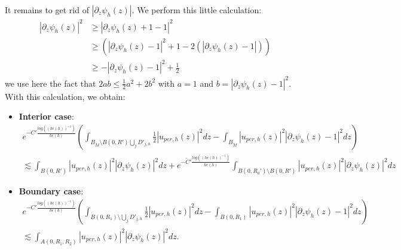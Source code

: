 \documentclass[leqno,11pt,letterpaper, english]{amsart}
\newcommand{\nn}{\nonumber}
\theoremstyle{plain}
\theoremstyle{definition}
\numberwithin{equation}{section}
\begin{document}
It remains to get rid of $|\partial_z \psi_h(z)|$. We perform this little calculation:
	\begin{align}
	\left|\partial_z \psi_h \left(z\right)\right|^2
		&\geq \left|\partial_z \psi_h \left(z\right)+1-1\right|^2\nn\\
		&\geq \left(\left|\partial_z \psi_h \left(z\right)-1\right|^2+1-2\left(\left|\partial_z \psi_h \left(z\right)-1\right|\right)\right)\nn\\
		&\geq - \left|\partial_z \psi_h \left(z\right)-1\right|^2 + \frac{1}{2} 
	\end{align}
we use here the fact that $2ab \leq \frac{1}{2}a^2 + 2b^2$ with $a = 1$ and $b = |\partial_z \psi_h(z) - 1|^2$. With this calculation, we obtain:
\begin{itemize}
\item \textbf{Interior case}:
	\begin{multline}
		e^{-C'  \frac{log((h\epsilon(h))^{-1})}{h\epsilon(h)}}\left(\int_{B_{\tilde{M}}\setminus B(0,R')\bigcup_j D'_{j,h}}  \frac{1}{2} |u_{per,h}(z)|^2 dz -\int_{B_{\tilde{M}}} |u_{per,h}(z)|^2\left|\partial_z \psi_h \left(z\right)-1\right|^2dz\right) \\   
		\lesssim \int_{B(0,R')} \left|u_{per,h}(z)\right|^2\left|\partial_z \psi_h\left(z\right)\right|^2dz+e^{-\tilde{C}'  \frac{log((h\epsilon(h))^{-1})}{h\epsilon(h)}}\int_{B(0,R_0')\setminus B(0,R')} \left|u_{per,h}(z)\right|^2\left|\partial_z \psi_h\left(z\right)\right|^2dz
	\end{multline}
\item \textbf{Boundary case}:
	\begin{multline}
		e^{-C'  \frac{log((h\epsilon(h))^{-1})}{h\epsilon(h)}}\left(\int_{B(0,R_1)\setminus \bigcup_j D'_{j,h}} \frac{1}{2} |u_{per,h}(z)|^2 dz -\int_{B(0,R_1)} |u_{per,h}(z)|^2\left|\partial_z \psi_h \left(z\right)-1\right|^2dz \right) \\
		\lesssim \int_{A(0,R_1,R_2)} \left|u_{per,h}(z)\right|^2\left|\partial_z \psi_h\left(z\right)\right|^2dz.
	\end{multline}
\end{itemize}
\end{document}
